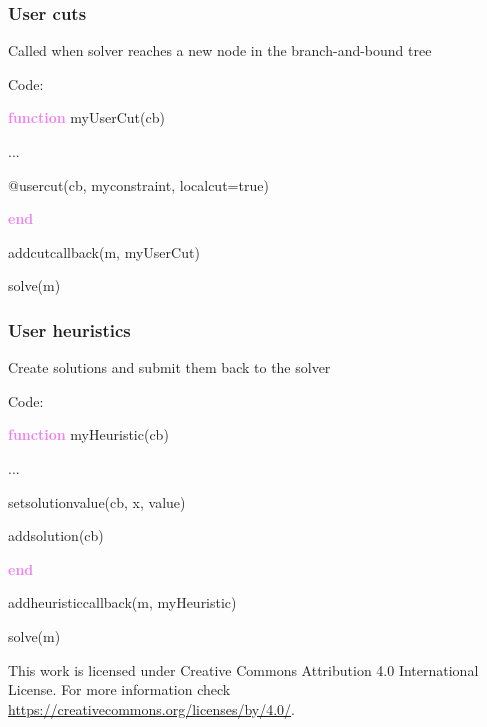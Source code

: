 \documentclass{beamer}
\begin{document}
\begin{frame}
  \frametitle{User cuts}
  Called when solver reaches a new node in the branch-and-bound tree

  \begin{block}{Code:}\footnotesize
    
    \textcolor{violet}{\textbf{function}} myUserCut(cb)
    
    \hspace{1cm}    ...
    
    \hspace{1cm}    @usercut(cb, myconstraint, localcut=true)

    \textcolor{violet}{\bf end}
    
    addcutcallback(m, myUserCut)

    solve(m)
  \end{block}
  
\end{frame}


\begin{frame}
  \frametitle{User heuristics}

  Create solutions and submit them back to the solver

  \begin{block}{Code:}\footnotesize
    
    \textcolor{violet}{\textbf{function}} myHeuristic(cb)
    
    \hspace{1cm}    ...
    
    \hspace{1cm}    setsolutionvalue(cb, x, value)
    
    \hspace{1cm}    addsolution(cb)

    \textcolor{violet}{\bf end}
    
    addheuristiccallback(m, myHeuristic)

    solve(m)
  \end{block}

\end{frame}


\begin{frame}
  \vfill
  \centering
  This work is licensed under Creative Commons Attribution 4.0 International License.
  For more information check \url{https://creativecommons.org/licenses/by/4.0/}.
  \vfill
\end{frame}
\end{document}
